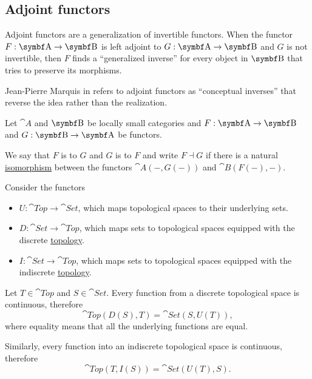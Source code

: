 \subsection{Adjoint functors}\label{subsec:adjoint_functors}

\begin{remark}\label{def:adjoint_functors}
  Adjoint functors are a generalization of invertible functors. When the functor \( F: \cat{A} \to \bop B \) is left adjoint to \( G: \cat{A} \to \bop B \) and \( G \) is not invertible, then \( F \) finds a \enquote{generalized inverse} for every object in \( \bop B \) that tries to preserve its morphisms.

  Jean-Pierre Marquis in \cite{StanfordPlato:category_theory} refers to adjoint functors as \enquote{conceptual inverses} that reverse the idea rather than the realization.
\end{remark}

\begin{definition}\label{def:adjoint_functor}
  Let \( \cat{A} \) and \( \bop B \) be locally small categories and \( F: \cat{A} \to \bop B \) and \( G: \bop B \to \cat{A} \) be functors.

  We say that \( F \) is  to \( G \) and \( G \) is  to \( F \) and write \( F \dashv G \) if there is a natural \hyperref[def:natural_isomorpism]{isomorphism} between the functors \( \cat{A}(-, G(-)) \) and \( \cat{B}(F(-), -) \).
\end{definition}

\begin{example}\label{ex:top_adjoint_functor}
  Consider the functors
  \begin{itemize}
    \item \( U: \cat{Top} \to \cat{Set} \), which maps topological spaces to their underlying sets.
    \item \( D: \cat{Set} \to \cat{Top} \), which maps sets to topological spaces equipped with the discrete \hyperref[def:standard_topologies/discrete]{topology}.
    \item \( I: \cat{Set} \to \cat{Top} \), which maps sets to topological spaces equipped with the indiscrete \hyperref[def:standard_topologies/indiscrete]{topology}.
  \end{itemize}

  Let \( T \in \cat{Top} \) and \( S \in \cat{Set} \). Every function from a discrete topological space is continuous, therefore
  \begin{equation*}
    \cat{Top}(D(S), T) = \cat{Set}(S, U(T)),
  \end{equation*}
  where equality means that all the underlying functions are equal.

  Similarly, every function into an indiscrete topological space is continuous, therefore
  \begin{equation*}
    \cat{Top}(T, I(S)) = \cat{Set}(U(T), S).
  \end{equation*}
\end{example}
